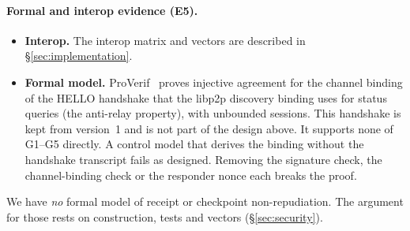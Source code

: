 \paragraph{Formal and interop evidence (E5).}
\begin{itemize}
\item \textbf{Interop.} The interop matrix and vectors are described in
  \S\ref{sec:implementation}.
\item \textbf{Formal model.} ProVerif~\cite{proverif} proves injective
  agreement for the channel binding of the HELLO handshake that the
  libp2p discovery binding uses for status queries (the anti-relay
  property), with unbounded sessions. This handshake is kept from
  version~1 and is not part of the design above. It supports none of
  G1--G5 directly. A control model that
  derives the binding without the handshake transcript fails as designed.
  Removing the signature check, the channel-binding check or the
  responder nonce each breaks the proof.
\end{itemize}
We have \emph{no} formal model of receipt or checkpoint non-repudiation.
The argument for those rests on construction, tests and vectors
(\S\ref{sec:security}).
